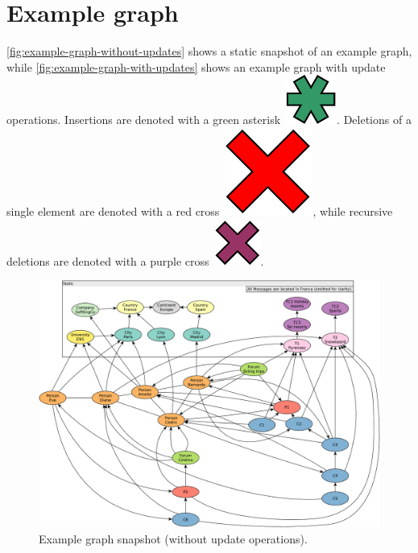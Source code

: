 \chapter{Example graph}
\label{sec:example-graph}

\autoref{fig:example-graph-without-updates} shows a static snapshot of an example graph, while \autoref{fig:example-graph-with-updates} shows an example graph with update operations.
Insertions are denoted with a green asterisk~\includegraphics[scale=0.25]{patterns/insert}.
Deletions of a single element are denoted with a red cross~\includegraphics[scale=0.25]{patterns/delete-single},
while recursive deletions are denoted with a purple cross~\includegraphics[scale=0.25]{patterns/delete-recursively}.

\begin{figure}[ht]
    \centering
    \includegraphics[width=\textwidth]{figures/example-graph-without-updates}
    \caption{Example graph snapshot (without update operations).}
    \label{fig:example-graph-without-updates}
\end{figure}

